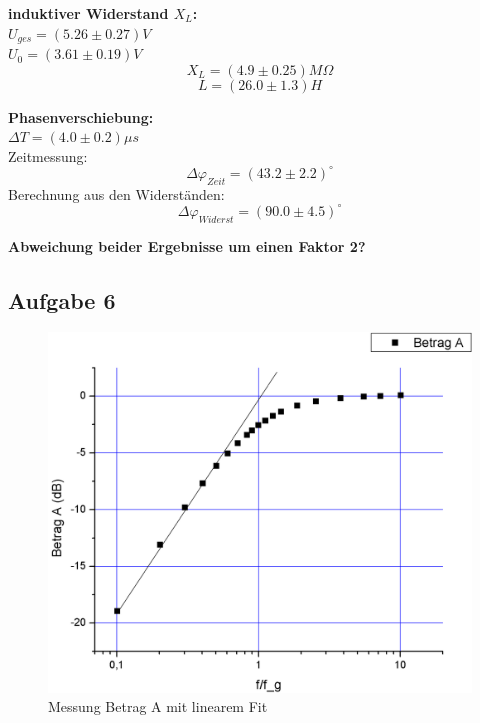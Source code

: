 \documentclass[12pt,a4paper]{article}
\begin{document}
\begin{multicols}{2}
\textbf{induktiver Widerstand $X_L$:}\\
$U_{ges}=(5.26\pm 0.27)V$\\
$U_0=(3.61 \pm 0.19)V$\\
$$X_L=(4.9\pm 0.25)M\Omega$$
$$L=(26.0 \pm 1.3)H$$

\textbf{Phasenverschiebung:}\\
$\Delta T = (4.0\pm 0.2) \mu s$\\
Zeitmessung:
$$\Delta \varphi_{Zeit} = (43.2 \pm 2.2)^\circ$$
Berechnung aus den Widerständen:
$$\Delta \varphi_{Widerst} = (90.0 \pm 4.5)^\circ$$

\noindent \textbf{Abweichung beider Ergebnisse um einen Faktor 2?}


\end{multicols}
\subsection{Aufgabe 6}
\begin{figure}[H]
	\centering
	\includegraphics[scale=0.40]{./figure/betrag_a.png}
	\caption{Messung Betrag A mit linearem Fit}
	\label{fig:betraga_linfit}
\end{figure}
\end{document}

